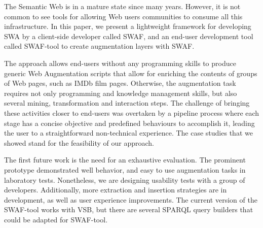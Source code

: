 \documentclass[runningheads]{llncs}
\begin{document}
The Semantic Web is in a mature state since many years. However, it is not common to see tools for allowing Web users communities to consume all this infrastructure. In this paper, we present a lightweight framework for developing SWA by a client-side developer called SWAF, and an end-user development tool called SWAF-tool to create augmentation layers with SWAF. 

The approach allows end-users without any programming skills to produce generic Web Augmentation scripts that allow for enriching the contents of groups of Web pages, such as IMDb film pages. Otherwise, the augmentation task requires not only programming and knowledge management skills, but also several mining, transformation and interaction steps. The challenge of bringing these activities closer to end-users was overtaken by a pipeline process where each stage has a concise objective and predefined behaviours to accomplish it, leading the user to a straightforward non-technical experience. The case studies that we showed stand for the feasibility of our approach.



The first future work is the need for an exhaustive evaluation. The prominent prototype demonstrated well behavior, and easy to use augmentation tasks in laboratory tests. Nonetheless, we are designing usability tests with a group of developers. Additionally, more extraction and insertion strategies are in development, as well as user experience improvements. The current version of the SWAF-tool works with VSB, but there are several SPARQL query builders that could be adapted for SWAF-tool.


%
%
%
% 
% 
%


\end{document}

